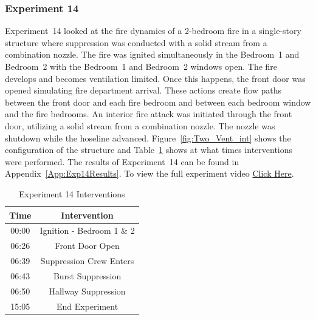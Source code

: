\documentclass[12pt,oneside]{book}
\begin{document}
\subsubsection{Experiment 14}
Experiment~14 looked at the fire dynamics of a 2-bedroom fire in a single-story structure where suppression was conducted with a solid stream from a combination nozzle. The fire was ignited simultaneously in the Bedroom~1 and Bedroom~2 with the Bedroom~1 and Bedroom~2 windows open. The fire develops and becomes ventilation limited. Once this happens, the front door was opened simulating fire department arrival. These actions create flow paths between the front door and each fire bedroom and between each bedroom window and the fire bedrooms. An interior fire attack was initiated through the front door, utilizing a solid stream from a combination nozzle. The nozzle was shutdown while the hoseline advanced. Figure~\ref{fig:Two_Vent_int} shows the configuration of the structure and Table~\ref{Table:Exp14Interventions} shows at what times interventions were performed. The results of Experiment~14 can be found in Appendix~\ref{App:Exp14Results}. To view the full experiment video \href{https://player.vimeo.com/video/170499611?autoplay=1}{Click Here}.

\begin{table}[H]
	\centering
	\caption{Experiment 14 Interventions}
	\begin{tabular}{|c|c|} 
		\hline
		Time & Intervention \\ \hline \hline
		00:00 & Ignition - Bedroom 1 \& 2 \\ \hline
		06:26 & Front Door Open \\ \hline
		06:39 & Suppression Crew Enters\\ \hline
		06:43 & Burst Suppression \\ \hline 
		06:50 & Hallway Suppression \\ \hline
		15:05 & End Experiment\\ \hline
	\end{tabular}
	\label{Table:Exp14Interventions}
\end{table}

\FloatBarrier
\end{document}
